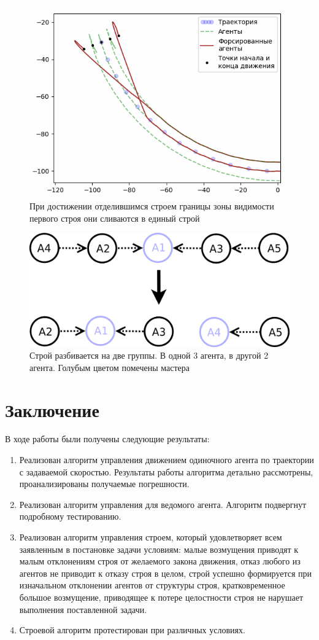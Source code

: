\documentclass[a4paper, 14pt]{extarticle}
\let\Oldsection\section
\renewcommand{\section}{\FloatBarrier\Oldsection}
\begin{document}
\begin{figure}
	\centering
	\includegraphics[width=0.7\linewidth]{platoon/with-bird-zoom2}
	\caption{При достижении отделившимся строем границы зоны видимости первого строя они сливаются в единый строй}
	\label{fig:with-bird-zoom2}
\end{figure}
\begin{figure}
	\centering
	\includegraphics[width=0.7\linewidth]{platoon/with-bird-to-groups}
	\caption{Строй разбивается на две группы. В одной 3 агента, в другой 2 агента. Голубым цветом помечены мастера}
	\label{fig:with-bird-to-groups}
\end{figure}

%
\section*{Заключение}
В ходе работы были получены следующие результаты:
\begin{enumerate}
	\item Реализован алгоритм управления движением одиночного агента по траектории с задаваемой скоростью. Результаты работы алгоритма детально рассмотрены, проанализированы получаемые погрешности. 
	\item Реализован алгоритм управления для ведомого агента. Алгоритм подвергнут подробному тестированию.
	\item Реализован алгоритм управления строем, который удовлетворяет всем заявленным в постановке задачи условиям: малые возмущения приводят к малым отклонениям строя от желаемого закона движения, отказ любого из агентов не приводит к отказу строя в целом, строй успешно формируется при изначальном отклонении агентов от структуры строя, кратковременное большое возмущение, приводящее к потере целостности строя не нарушает выполнения поставленной задачи.
	\item Строевой алгоритм протестирован при различных условиях.
\end{enumerate}
\end{document}
